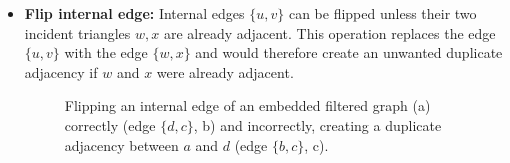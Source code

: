 \begin{itemize}
	\item \textbf{Flip internal edge:} Internal edges $\{u, v\}$ can be flipped unless their two incident triangles  $w, x$ are already adjacent. This operation replaces the edge $\{u, v\}$ with the edge $\{w, x\}$ and would therefore create an unwanted duplicate adjacency if $w$ and $x$ were already adjacent.
\begin{figure}[H]
	\centering
	\quad
	\quad
	\caption{Flipping an internal edge of an embedded filtered graph (a) correctly (edge $\{d,c\}$, b) and incorrectly, creating a duplicate adjacency between $a$ and $d$ (edge $\{b,c\}$, c).}
	\label{fig:transformation}
\end{figure}


\end{itemize}
